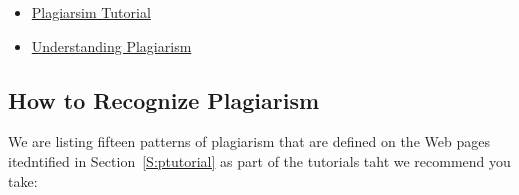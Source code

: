 \begin{itemize}
\item
  \href{https://www.indiana.edu/~academy/firstPrinciples/choice.html}{Plagiarsim
    Tutorial}
\item
  \href{https://www.indiana.edu/~tedfrick/plagiarism/}{Understanding
  Plagiarism}
\end{itemize}

\subsection{How to Recognize Plagiarism}

We are listing fifteen patterns of plagiarism that are defined on the Web
pages itedntified in Section~\ref{S:ptutorial} as part of the
tutorials taht we recommend you take:

